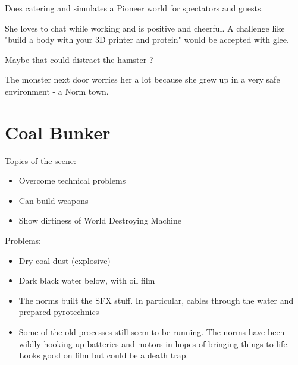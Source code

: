 \begin{npcBox}[title=Cherie]
    \begin{consequences}
    \item {}
    \item {}
    \item {}
    \end{consequences}
    
    \begin{npcDescription}
    Does catering and simulates a Pioneer world for spectators and guests.
    
    She loves to chat while working and is positive and cheerful. A challenge like "build a body with your 3D printer and protein" would be accepted with glee.

    Maybe that could distract the hamster ?

    The monster next door worries her a lot because she grew up in a very safe environment - a Norm town.

    \end{npcDescription}
    
\end{npcBox}



\section{Coal Bunker}

Topics of the scene:
\begin{itemize}
\item Overcome technical problems
\item Can build weapons
\item Show dirtiness of World Destroying Machine
\end{itemize}

Problems:

\begin{itemize}
\item Dry coal dust (explosive)
\item Dark black water below, with oil film
\item The norms built the SFX stuff. In particular, cables through the water and prepared pyrotechnics
\item Some of the old processes still seem to be running. The norms have been wildly hooking up batteries and motors in hopes of bringing things to life. Looks good on film but could be a death trap.
\end{itemize}

